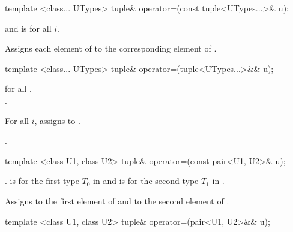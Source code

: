 %
\begin{itemdecl}
template <class... UTypes>
  tuple& operator=(const tuple<UTypes...>& u);
\end{itemdecl}

\begin{itemdescr}
\pnum
\requires
{} and
 is  for all $i$.

\pnum
\effects  Assigns each element of  to the corresponding element
of .

\pnum
\returns  {}
\end{itemdescr}

%
\begin{itemdecl}
template <class... UTypes>
  tuple& operator=(tuple<UTypes...>&& u);
\end{itemdecl}

\begin{itemdescr}
\pnum
\requires
{} for all .
 \tcode{==}\\.

\pnum
\effects For all $i$, assigns  to
.

\pnum
\returns {}.
\end{itemdescr}

%
%
\begin{itemdecl}
template <class U1, class U2> tuple& operator=(const pair<U1, U2>& u);
\end{itemdecl}

\begin{itemdescr}
\pnum
\requires {}.
 is  for the first type $T_0$ in
 and  is  for the
second type $T_1$ in .

\pnum
\effects  Assigns  to the first element of 
and  to the second element of .

\pnum
\returns  {}
\end{itemdescr}

%
%
\begin{itemdecl}
template <class U1, class U2> tuple& operator=(pair<U1, U2>&& u);
\end{itemdecl}

